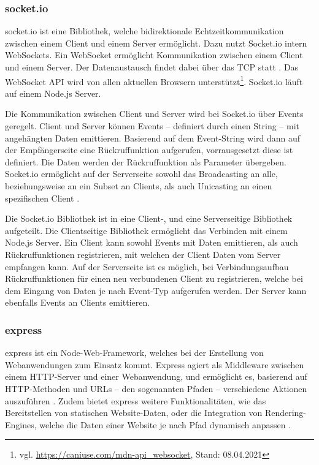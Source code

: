 \subsubsection{socket.io}
\glqq{}socket.io\grqq{} ist eine Bibliothek, welche bidirektionale Echtzeitkommunikation zwischen einem Client und einem Server ermöglicht. Dazu nutzt Socket.io intern WebSockets\cite{socketio}. Ein WebSocket ermöglicht Kommunikation zwischen einem Client und einem Server. Der Datenaustausch findet dabei über das \ac{TCP} statt \cite{websocketRFC}. Das WebSocket \ac{API} wird von allen aktuellen Browsern unterstützt\footnote{vgl. \url{https://caniuse.com/mdn-api_websocket}, Stand: 08.04.2021}. Socket.io läuft auf einem Node.js Server\cite{socketio}.\par

Die Kommunikation zwischen Client und Server wird bei Socket.io über Events geregelt. Client und Server können Events -- definiert durch einen String -- mit angehängten Daten emittieren. Basierend auf dem Event-String wird dann auf der Empfängerseite eine Rückruffunktion aufgerufen, vorrausgesetzt diese ist definiert. Die Daten werden der Rückruffunktion als Parameter übergeben. Socket.io ermöglicht auf der Serverseite sowohl das Broadcasting an alle, beziehungsweise an ein Subset an Clients, als auch Unicasting an einen spezifischen Client \cite{socketio}.\par

Die Socket.io Bibliothek ist in eine Client-, und eine Serverseitige Bibliothek aufgeteilt. Die Clientseitige Bibliothek ermöglicht das Verbinden mit einem Node.js Server. Ein Client kann sowohl Events mit Daten emittieren, als auch Rückruffunktionen registrieren, mit welchen der Client Daten vom Server empfangen kann. Auf der Serverseite ist es möglich, bei Verbindungsaufbau Rückruffunktionen für einen neu verbundenen Client zu registrieren, welche bei dem Eingang von Daten je nach Event-Typ aufgerufen werden. Der Server kann ebenfalls Events an Clients emittieren.

\subsubsection{express}
\glqq{}express\grqq{} ist ein Node-Web-Framework, welches bei der Erstellung von Webanwendungen zum Einsatz kommt. Express agiert als Middleware zwischen einem \acs{HTTP}-Server und einer Webanwendung, und ermöglicht es, basierend auf \acs{HTTP}-Methoden und \acs{URL}s -- den sogenannten \glqq{}Pfaden\grqq{} -- verschiedene Aktionen auszuführen \cite{express}. Zudem bietet express weitere Funktionalitäten, wie das Bereitstellen von statischen Website-Daten, oder die Integration von \glqq{}Rendering-Engines\grqq{}, welche die Daten einer Website je nach Pfad dynamisch anpassen \cite{express}.